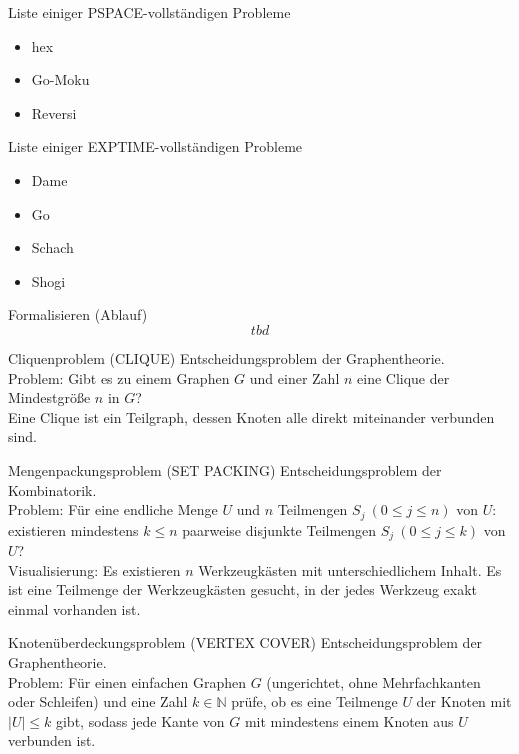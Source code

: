 \documentclass[a7paper,print,grid=both]{kartei}
\begin{document}
\begin{karte}{Liste einiger PSPACE-vollständigen Probleme}
\begin{itemize}
    \setlength{\itemindent}{-0.5cm}
    \setlength{\itemsep}{-0.1cm}
    \item hex
    \item Go-Moku
    \item Reversi
\end{itemize}
\end{karte}
\begin{karte}{Liste einiger EXPTIME-vollständigen Probleme}
\begin{itemize}
    \setlength{\itemindent}{-0.5cm}
    \setlength{\itemsep}{-0.1cm}
    \item Dame
    \item Go
    \item Schach
    \item Shogi
\end{itemize}
\end{karte}
\begin{karte}{Formalisieren (Ablauf)}
\[tbd\]
\end{karte}
\begin{karte}{Cliquenproblem (CLIQUE)}
Entscheidungsproblem der Graphentheorie.\\
Problem: Gibt es zu einem Graphen $G$ und einer Zahl $n$ eine Clique der Mindestgröße $n$ in $G$?\\
Eine Clique ist ein Teilgraph, dessen Knoten alle direkt miteinander verbunden sind.
\end{karte}
\begin{karte}{Mengenpackungsproblem (SET PACKING)}
Entscheidungsproblem der Kombinatorik.\\
Problem: Für eine endliche Menge $U$ und $n$ Teilmengen $S_j~(0 \leq j \leq n)$ von $U$: existieren mindestens $k \leq n$ paarweise disjunkte Teilmengen $S_j~(0 \leq j \leq k)$ von $U$?\\
Visualisierung: Es existieren $n$ Werkzeugkästen mit unterschiedlichem Inhalt. Es ist eine Teilmenge der Werkzeugkästen gesucht, in der jedes Werkzeug exakt einmal vorhanden ist.
\end{karte}
\begin{karte}{Knotenüberdeckungsproblem (VERTEX COVER)}
Entscheidungsproblem der Graphentheorie.\\
Problem: Für einen einfachen Graphen $G$ (ungerichtet, ohne Mehrfachkanten oder Schleifen) und eine Zahl $k \in \mathbb{N}$ prüfe, ob es eine Teilmenge $U$ der Knoten mit $|U| \leq k$ gibt, sodass jede Kante von $G$ mit mindestens einem Knoten aus $U$ verbunden ist.
\end{karte}
\end{document}
